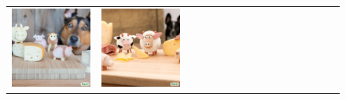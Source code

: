 \begin{figure}[ht!]
\begin{adjustwidth}{-0.8in}{-0.5in}
\begin{tabular}{cccccccccccccccccccc}
\multicolumn{3}{c}{\includegraphics[width=\twobytwocolwidth\textwidth]{figures/cherries/cheese_dog_0.jpg}} &
\multicolumn{3}{c}{\includegraphics[width=\twobytwocolwidth\textwidth]{figures/cherries/cheese_dog_1.jpg}} &&

\end{tabular}
\end{adjustwidth}
\end{figure}
